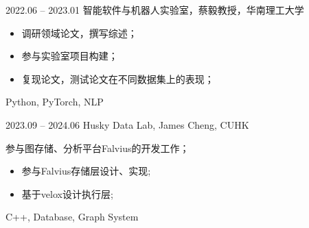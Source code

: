 %
%


\begin{experiences}
  \experiencenew
  {2022.06 -- 2023.01} {智能软件与机器人实验室，蔡毅教授，华南理工大学 }
  {
    \begin{itemize}
  		\item 调研领域论文，撰写综述；
  		\item 参与实验室项目构建；
  		\item 复现论文，测试论文在不同数据集上的表现；
  	\end{itemize}
  }
  {Python, PyTorch, NLP}
  \emptySeparator

  \experiencenew
  {2023.09 -- 2024.06} {Husky Data Lab, James Cheng, CUHK }
  {
    参与图存储、分析平台Falvius的开发工作；
    \begin{itemize}
  		\item 参与Falvius存储层设计、实现;
  		\item 基于velox设计执行层;
  	\end{itemize}
  }
  {C++, Database, Graph System}


\end{experiences}
